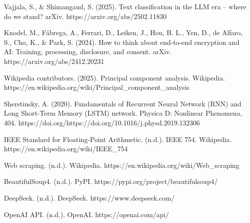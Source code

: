 \documentclass[licencjacka,en]{pracamgr}
\begin{document}
\begin{thebibliography}{99}
Vajjala, S., \& Shimangaud, S. (2025). Text classification in the LLM era – where do we stand? arXiv. https://arxiv.org/abs/2502.11830

Knodel, M., Fábrega, A., Ferrari, D., Leiken, J., Hou, B. L., Yen, D., de Alfaro, S., Cho, K., \& Park, S. (2024). How to think about end-to-end encryption and AI: Training, processing, disclosure, and consent. arXiv. https://arxiv.org/abs/2412.20231

Wikipedia contributors. (2025). Principal component analysis. Wikipedia. https://en.wikipedia.org/wiki/Principal\_component\_analysis

Sherstinsky, A. (2020). Fundamentals of Recurrent Neural Network (RNN) and Long Short-Term Memory (LSTM) network. Physica D: Nonlinear Phenomena, 404. https://doi.org/https://doi.org/10.1016/j.physd.2019.132306

IEEE Standard for Floating-Point Arithmetic. (n.d.). IEEE 754. Wikipedia. https://en.wikipedia.org/wiki/IEEE\_754

Web scraping. (n.d.). Wikipedia. https://en.wikipedia.org/wiki/Web\_scraping

BeautifulSoup4. (n.d.). PyPI. https://pypi.org/project/beautifulsoup4/

DeepSeek. (n.d.). DeepSeek. https://www.deepseek.com/

OpenAI API. (n.d.). OpenAI. https://openai.com/api/


\end{thebibliography}
\end{document}
